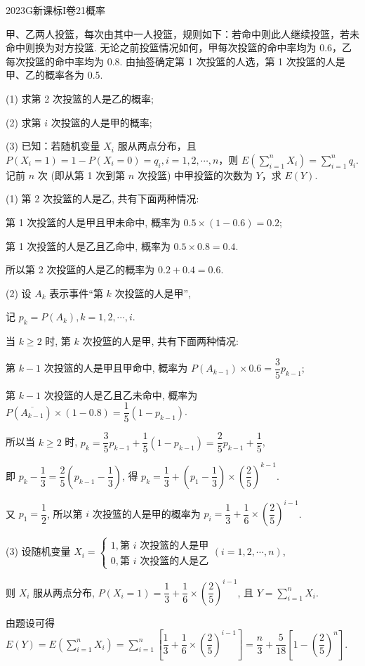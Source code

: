 
\begin{problem}{2023}{G}{新课标I卷}{21}{概率}

甲、乙两人投篮，每次由其中一人投篮，规则如下：若命中则此人继续投篮，若未命中则换为对方投篮. 无论之前投篮情况如何，甲每次投篮的命中率均为 0.6，乙每次投篮的命中率均为 0.8. 由抽签确定第 1 次投篮的人选，第 1 次投篮的人是甲、乙的概率各为 0.5.

(1) 求第 2 次投篮的人是乙的概率;

(2) 求第 $i$ 次投篮的人是甲的概率;

(3) 已知：若随机变量 $X_i$ 服从两点分布，且 $P(X_i=1)=1-P(X_i=0)=q_i, i=1,2,\cdots,n$，则 $E\left(\sum\limits_{i=1}^n X_i\right)=\sum\limits_{i=1}^n q_i$. 记前 $n$ 次 (即从第 1 次到第 $n$ 次投篮) 中甲投篮的次数为 $Y$，求 $E(Y)$.

\end{problem}

\begin{solutions}
(1) 第 2 次投篮的人是乙, 共有下面两种情况:

第 1 次投篮的人是甲且甲未命中, 概率为 $0.5 \times (1-0.6)=0.2$;

第 1 次投篮的人是乙且乙命中, 概率为 $0.5 \times 0.8=0.4$.

所以第 2 次投篮的人是乙的概率为 $0.2+0.4=0.6$.

(2) 设 $A_k$ 表示事件“第 $k$ 次投篮的人是甲”,

记 $p_k=P(A_k), k=1, 2, \cdots, i$.

当 $k \ge 2$ 时, 第 $k$ 次投篮的人是甲, 共有下面两种情况:

第 $k-1$ 次投篮的人是甲且甲命中, 概率为 $P(A_{k-1}) \times 0.6 = \dfrac{3}{5}p_{k-1}$;

第 $k-1$ 次投篮的人是乙且乙未命中, 概率为 $P(\overline{A_{k-1}}) \times (1-0.8) = \dfrac{1}{5}(1-p_{k-1})$.

所以当 $k \ge 2$ 时, $p_k = \dfrac{3}{5}p_{k-1} + \dfrac{1}{5}(1-p_{k-1}) = \dfrac{2}{5}p_{k-1} + \dfrac{1}{5}$,

即 $p_k - \dfrac{1}{3} = \dfrac{2}{5}(p_{k-1} - \dfrac{1}{3})$, 得 $p_k = \dfrac{1}{3} + (p_1 - \dfrac{1}{3}) \times (\dfrac{2}{5})^{k-1}$.

又 $p_1 = \dfrac{1}{2}$, 所以第 $i$ 次投篮的人是甲的概率为 $p_i = \dfrac{1}{3} + \dfrac{1}{6} \times (\dfrac{2}{5})^{i-1}$.

(3) 设随机变量 $X_i = \begin{cases} 1, \text{第 } i \text{ 次投篮的人是甲} \\ 0, \text{第 } i \text{ 次投篮的人是乙} \end{cases} (i=1, 2, \cdots, n)$,

则 $X_i$ 服从两点分布, $P(X_i=1) = \dfrac{1}{3} + \dfrac{1}{6} \times (\dfrac{2}{5})^{i-1}$, 且 $Y = \displaystyle\sum_{i=1}^n X_i$.

由题设可得 $E(Y) = E(\displaystyle\sum_{i=1}^n X_i) = \displaystyle\sum_{i=1}^n [\dfrac{1}{3} + \dfrac{1}{6} \times (\dfrac{2}{5})^{i-1}] = \dfrac{n}{3} + \dfrac{5}{18}[1-(\dfrac{2}{5})^n]$.
\end{solutions}
